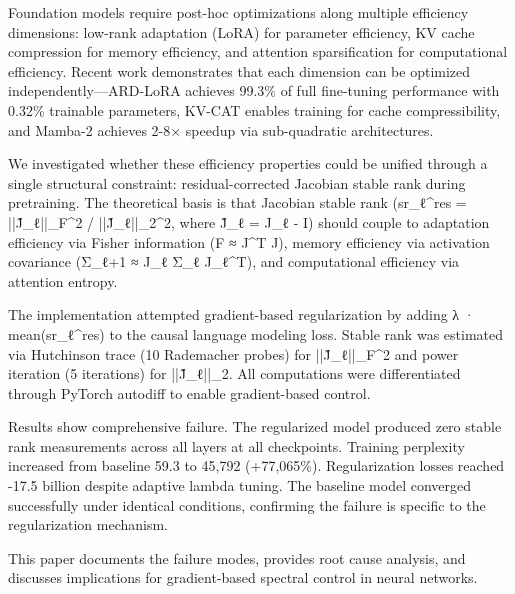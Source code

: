 
Foundation models require post-hoc optimizations along multiple efficiency dimensions: low-rank adaptation (LoRA) for parameter efficiency, KV cache compression for memory efficiency, and attention sparsification for computational efficiency. Recent work demonstrates that each dimension can be optimized independently—ARD-LoRA achieves 99.3\% of full fine-tuning performance with 0.32\% trainable parameters, KV-CAT enables training for cache compressibility, and Mamba-2 achieves 2-8× speedup via sub-quadratic architectures.

We investigated whether these efficiency properties could be unified through a single structural constraint: residual-corrected Jacobian stable rank during pretraining. The theoretical basis is that Jacobian stable rank (sr_ℓ^res = ||J̃_ℓ||_F^2 / ||J̃_ℓ||_2^2, where J̃_ℓ = J_ℓ - I) should couple to adaptation efficiency via Fisher information (F ≈ J^T J), memory efficiency via activation covariance (Σ_{ℓ+1} ≈ J_ℓ Σ_ℓ J_ℓ^T), and computational efficiency via attention entropy.

The implementation attempted gradient-based regularization by adding λ · mean(sr_ℓ^res) to the causal language modeling loss. Stable rank was estimated via Hutchinson trace (10 Rademacher probes) for ||J̃_ℓ||_F^2 and power iteration (5 iterations) for ||J̃_ℓ||_2. All computations were differentiated through PyTorch autodiff to enable gradient-based control.

Results show comprehensive failure. The regularized model produced zero stable rank measurements across all layers at all checkpoints. Training perplexity increased from baseline 59.3 to 45,792 (+77,065\%). Regularization losses reached -17.5 billion despite adaptive lambda tuning. The baseline model converged successfully under identical conditions, confirming the failure is specific to the regularization mechanism.

This paper documents the failure modes, provides root cause analysis, and discusses implications for gradient-based spectral control in neural networks.
